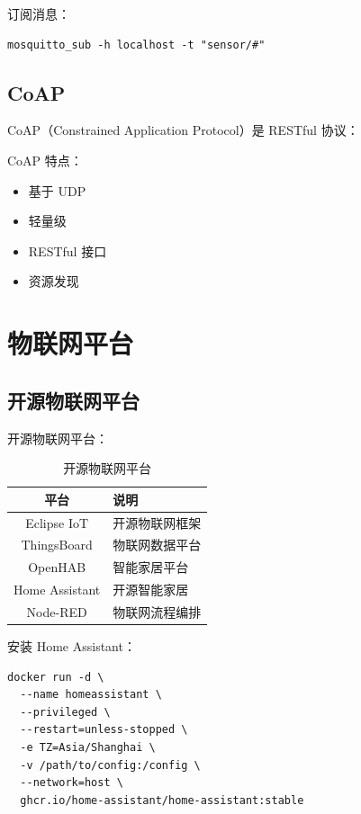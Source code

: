 \documentclass[12pt,UTF8]{ctexbook}
\begin{document}
订阅消息：
\begin{verbatim}
mosquitto_sub -h localhost -t "sensor/#"
\end{verbatim}

\section{CoAP}
\label{sec:coap}

CoAP（Constrained Application Protocol）是 RESTful 协议：

CoAP 特点：
\begin{itemize}
    \item 基于 UDP
    \item 轻量级
    \item RESTful 接口
    \item 资源发现
\end{itemize}

\chapter{物联网平台}
\label{chap:platforms}

\section{开源物联网平台}
\label{sec:open_source_platforms}

开源物联网平台：
\begin{table}[htbp]
    \centering
    \caption{开源物联网平台}
    \begin{tabular}{|c|p{8cm}|}
        \hline
        \textbf{平台} & \textbf{说明} \\
        \hline
        Eclipse IoT & 开源物联网框架 \\
        \hline
        ThingsBoard & 物联网数据平台 \\
        \hline
        OpenHAB & 智能家居平台 \\
        \hline
        Home Assistant & 开源智能家居 \\
        \hline
        Node-RED & 物联网流程编排 \\
        \hline
    \end{tabular}
\end{table}

安装 Home Assistant：
\begin{verbatim}
docker run -d \
  --name homeassistant \
  --privileged \
  --restart=unless-stopped \
  -e TZ=Asia/Shanghai \
  -v /path/to/config:/config \
  --network=host \
  ghcr.io/home-assistant/home-assistant:stable
\end{verbatim}
\end{document}
